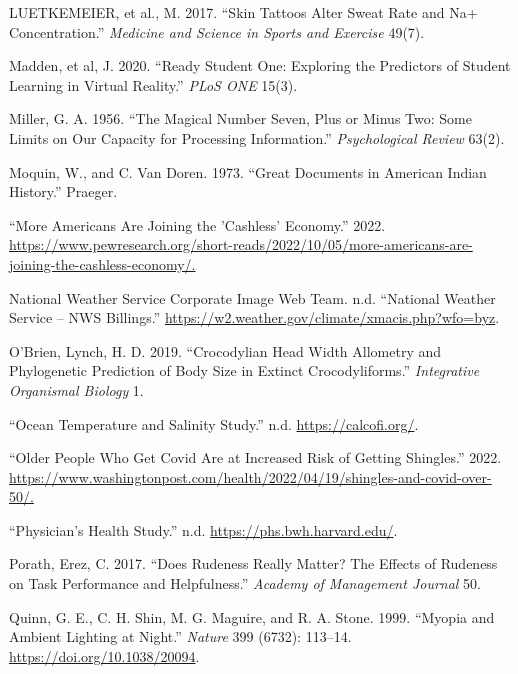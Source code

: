 \documentclass[
]{report}
\newlength{\cslhangindent}
\newenvironment{CSLReferences}[2] %
 {\begin{list}{}{%
  \setlength{\itemindent}{0pt}
  \setlength{\leftmargin}{0pt}
  \setlength{\parsep}{0pt}
  \ifodd #1
   \setlength{\leftmargin}{\cslhangindent}
   \setlength{\itemindent}{-1\cslhangindent}
  \fi
  \setlength{\itemsep}{#2\baselineskip}}}
 {\end{list}}
\begin{document}
\begin{CSLReferences}{1}{0}
LUETKEMEIER, et al., M. 2017. {``Skin Tattoos Alter Sweat Rate and Na+ Concentration.''} \emph{Medicine and Science in Sports and Exercise} 49(7).

Madden, et al, J. 2020. {``Ready Student One: Exploring the Predictors of Student Learning in Virtual Reality.''} \emph{PLoS ONE} 15(3).

Miller, G. A. 1956. {``The Magical Number Seven, Plus or Minus Two: Some Limits on Our Capacity for Processing Information.''} \emph{Psychological Review} 63(2).

Moquin, W., and C. Van Doren. 1973. {``Great Documents in American Indian History.''} Praeger.

{``More Americans Are Joining the 'Cashless' Economy.''} 2022. \url{https://www.pewresearch.org/short-reads/2022/10/05/more-americans-are-joining-the-cashless-economy/.}

National Weather Service Corporate Image Web Team. n.d. {``National Weather Service -- {NWS} Billings.''} \url{https://w2.weather.gov/climate/xmacis.php?wfo=byz}.

O'Brien, Lynch, H. D. 2019. {``Crocodylian Head Width Allometry and Phylogenetic Prediction of Body Size in Extinct Crocodyliforms.''} \emph{Integrative Organismal Biology} 1.

{``Ocean Temperature and Salinity Study.''} n.d. \url{https://calcofi.org/}.

{``Older People Who Get Covid Are at Increased Risk of Getting Shingles.''} 2022. \url{https://www.washingtonpost.com/health/2022/04/19/shingles-and-covid-over-50/.}

{``Physician's Health Study.''} n.d. \url{https://phs.bwh.harvard.edu/}.

Porath, Erez, C. 2017. {``Does Rudeness Really Matter? The Effects of Rudeness on Task Performance and Helpfulness.''} \emph{Academy of Management Journal} 50.

Quinn, G. E., C. H. Shin, M. G. Maguire, and R. A. Stone. 1999. {``Myopia and Ambient Lighting at Night.''} \emph{Nature} 399 (6732): 113--14. \url{https://doi.org/10.1038/20094}.


\end{CSLReferences}
\end{document}
